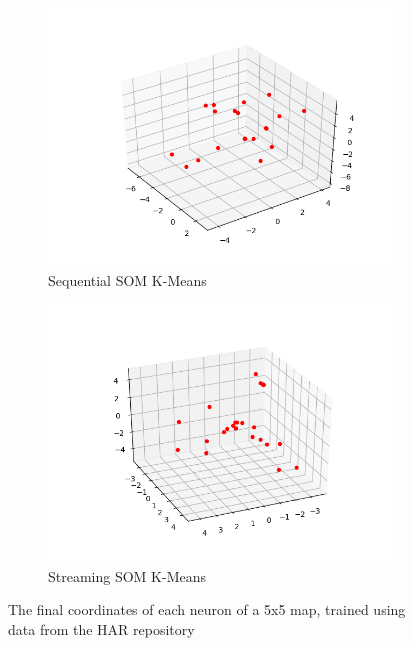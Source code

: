 \documentclass{l4proj}
\begin{document}
\begin{figure}[H]
\label{som-real}
\begin{subfigure}{.5\textwidth}
  \includegraphics[width=0.95\linewidth]{images/result16}
  \caption{Sequential SOM K-Means}
  \label{fig:res16}
\end{subfigure}%
\begin{subfigure}{.5\textwidth}
  \includegraphics[width=0.95\linewidth]{images/result17}
  \caption{Streaming SOM K-Means}
  \label{fig:res17}
\end{subfigure}
\caption{The final coordinates of each neuron of a 5x5 map, trained using data from the HAR repository}
\end{figure}

\end{document}
